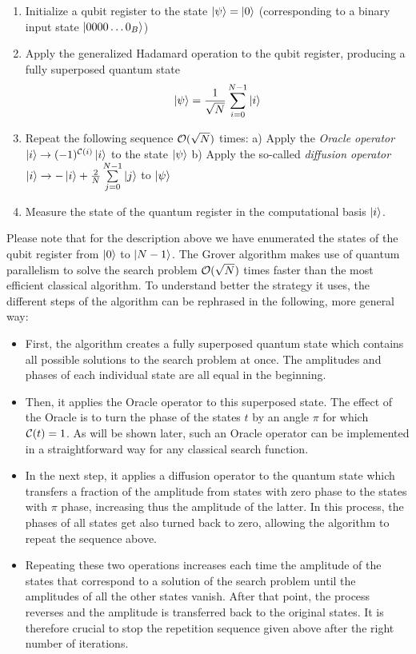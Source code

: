 \begin{enumerate}
 \item Initialize a qubit register to the state $\left| \psi \right> = \left| 0 \right>$ (corresponding to a binary input state $\left| 0000\hdots0_B \right>$)
 \item Apply the generalized Hadamard operation to the qubit register, producing a fully superposed quantum state $$\left| \psi \right> = \frac{1}{\sqrt{N}}\sum\limits_{i=0}^{N-1} \left| i \right>$$
 \item Repeat the following sequence $\begin{mathcal}O\end{mathcal}(\sqrt{N})$ times:
 \subitem a) Apply the {\it Oracle operator} $\ket{i}\to (-1)^{\Or(i)}\ket{i}$ to the state $\left| \psi \right>$
 \subitem b) Apply the so-called {\it diffusion operator} $\left| i \right> \to -\left| i \right>+\frac{2}{N}\sum\limits_{j=0}^{N-1}\left| j \right>$ to $\left| \psi \right>$
	\item Measure the state of the quantum register in the computational basis $\left| i \right>$.
\end{enumerate}

Please note that for the description above we have enumerated the states of the qubit register from $\left| 0 \right>$ to $\left| N-1 \right>$. The Grover algorithm makes use of quantum parallelism to solve the search problem $\begin{mathcal}O\end{mathcal}(\sqrt{N})$ times faster than the most efficient classical algorithm. To understand better the strategy it uses, the different steps of the algorithm can be rephrased in the following, more general way:

\begin{itemize}
\item First, the algorithm creates a fully superposed quantum state which contains all possible solutions to the search problem at once. The amplitudes and phases of each individual state are all equal in the beginning.
\item Then, it applies the Oracle operator to this superposed state. The effect of the Oracle is to turn the phase of the states $t$ by an angle $\pi$ for which $\Or(t)=1$. As will be shown later, such an Oracle operator can be implemented in a straightforward way for any classical search function.
\item In the next step, it applies a diffusion operator to the quantum state which transfers a fraction of the amplitude from states with zero phase to the states with $\pi$ phase, increasing thus the amplitude of the latter. In this process, the phases of all states get also turned back to zero, allowing the algorithm to repeat the sequence above.
\item Repeating these two operations increases each time the amplitude of the states that correspond to a solution of the search problem until the amplitudes of all the other states vanish. After that point, the process reverses and the amplitude is transferred back to the original states. It is therefore crucial to stop the repetition sequence given above after the right number of iterations.
\end{itemize}

